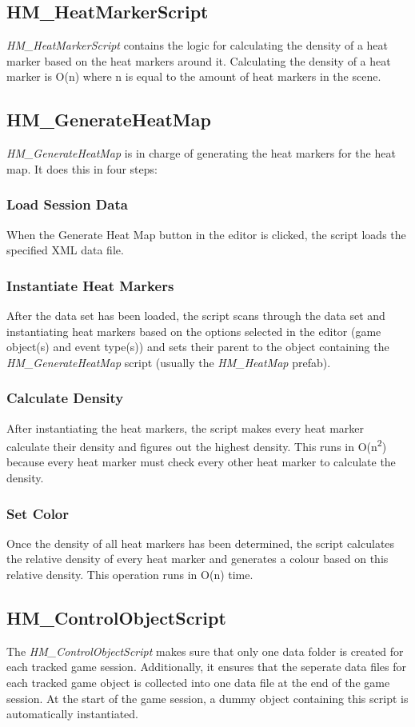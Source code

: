 \subsection{HM\_HeatMarkerScript}
\label{CO_HMS}
\textit{HM\_HeatMarkerScript} contains the logic for calculating the density of a heat marker based on the heat markers around it. Calculating the density of a heat marker is O(n) where n is equal to the amount of heat markers in the scene.

\subsection{HM\_GenerateHeatMap}
\label{CO_GHM}
\textit{HM\_GenerateHeatMap} is in charge of generating the heat markers for the heat map. It does this in four steps:
\subsubsection{Load Session Data}
When the Generate Heat Map button in the editor is clicked, the script loads the specified XML data file.
\subsubsection{Instantiate Heat Markers}
After the data set has been loaded, the script scans through the data set and instantiating heat markers based on the options selected in the editor (game object(s) and event type(s)) and sets their parent to the object containing the \textit{HM\_GenerateHeatMap} script (usually the \textit{HM\_HeatMap} prefab).
\subsubsection{Calculate Density}
\label{CO_GHM_CD}
After instantiating the heat markers, the script makes every heat marker calculate their density and figures out the highest density. This runs in O(n\textsuperscript{2}) because every heat marker must check every other heat marker to calculate the density.
\subsubsection{Set Color}
Once the density of all heat markers has been determined, the script calculates the relative density of every heat marker and generates a colour based on this relative density. This operation runs in O(n) time.

\subsection{HM\_ControlObjectScript}
\label{CO_COS}
The \textit{HM\_ControlObjectScript} makes sure that only one data folder is created for each tracked game session. Additionally, it ensures that the seperate data files for each tracked game object is collected into one data file at the end of the game session. At the start of the game session, a dummy object containing this script is automatically instantiated. 

